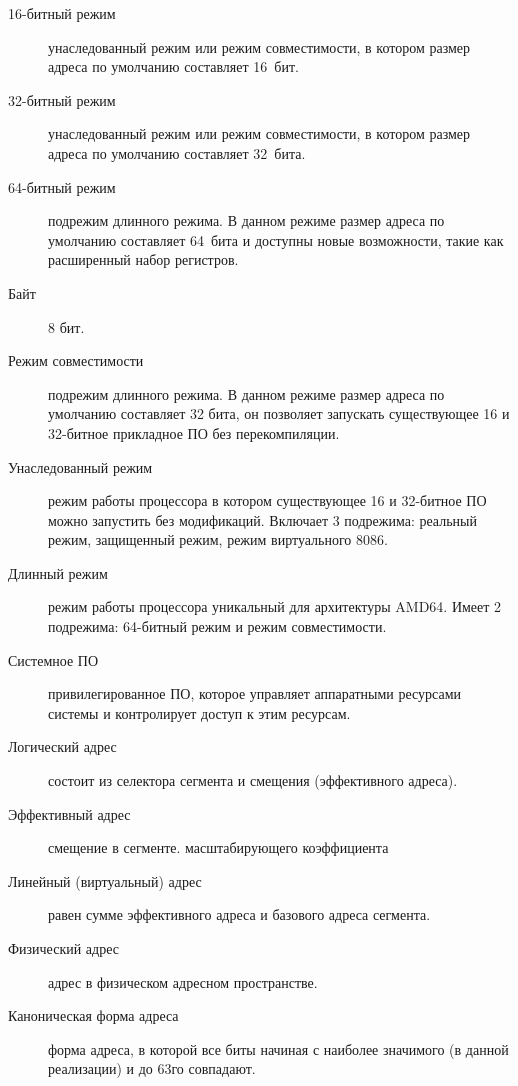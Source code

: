 \Defines
\begin{description}
\item[16-битный режим] унаследованный режим или режим совместимости, в котором размер адреса по умолчанию составляет 16~бит.
\item[32-битный режим] унаследованный режим или режим совместимости, в котором размер адреса по умолчанию составляет 32~бита.
\item[64-битный режим] подрежим длинного режима. В данном режиме размер адреса по умолчанию составляет 64~бита и доступны
новые возможности, такие как расширенный набор регистров.
\item[Байт] 8 бит.
\item[Режим совместимости] подрежим длинного режима. В данном режиме размер адреса по умолчанию составляет 32 бита, он
позволяет запускать существующее 16 и 32-битное прикладное ПО без перекомпиляции.
\item[Унаследованный режим] режим работы процессора в котором существующее 16 и 32-битное ПО можно запустить без модификаций.
Включает 3 подрежима: реальный режим, защищенный режим, режим виртуального 8086.
\item[Длинный режим] режим работы процессора уникальный для архитектуры AMD64. Имеет 2 подрежима: 64-битный режим и
режим совместимости.
\item[Системное ПО] привилегированное ПО, которое управляет аппаратными ресурсами системы и контролирует доступ к этим ресурсам.
\item[Логический адрес] состоит из селектора сегмента и смещения (эффективного адреса).
\item[Эффективный адрес] смещение в сегменте.
масштабирующего коэффициента
\item[Линейный (виртуальный) адрес] равен сумме эффективного адреса и базового адреса сегмента.
\item[Физический адрес] адрес в физическом адресном пространстве.
\item[Каноническая форма адреса] форма адреса, в которой все биты начиная с наиболее значимого (в данной реализации) и до 63го совпадают.
\end{description}

